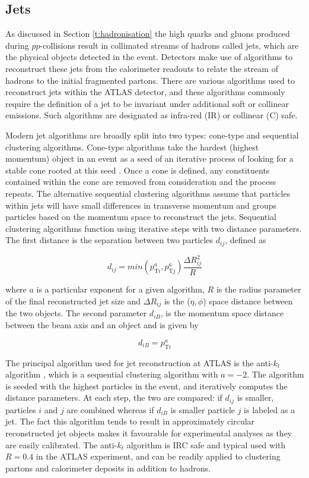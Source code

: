	\subsection{Jets}
	\label{d:jetreco}

	As discussed in Section \ref{t:hadronisation} the high \pt quarks and gluons produced during $pp$-collisions result in collimated streams of hadrons called jets, which are the physical objects detected in the event. Detectors make use of algorithms to reconstruct these jets from the calorimeter readouts to relate the stream of hadrons to the initial fragmented partons. There are various algorithms used to reconstruct jets within the ATLAS detector, and these algorithms commonly require the definition of a jet to be invariant under additional soft or collinear emissions. Such algorithms are designated as infra-red (IR) or collinear (C) safe.

	Modern jet algorithms are broadly split into two types: cone-type and sequential clustering algorithms. Cone-type algorithms take the hardest (highest momentum) object in an event as a seed of an iterative process of looking for a stable cone rooted at this seed \cite{cone-type}. Once a cone is defined, any constituents contained within the cone are removed from consideration and the process repeats. The alternative sequential clustering algorithms assume that particles within jets will have small differences in transverse momentum and groups particles based on the momentum space to reconstruct the jets. Sequential clustering algorithms function using iterative steps with two distance parameters. The first distance is the separation between two particles $d_{ij}$, defined as

	\begin{equation}
		d_{ij} = min(p_{\text{T}i}^a, p_{\text{T}j}^a)\frac{\Delta R_{ij}^2}{R}
	\end{equation}

	where $a$ is a particular exponent for a given algorithm, $R$ is the radius parameter of the final reconstructed jet size and $\Delta R_{ij}$ is the ($\eta, \phi$) space distance between the two objects. The second parameter $d_{iB}$, is the momentum space distance between the beam axis and an object \cite{jetreco} and is given by

	\begin{equation}
	d_{iB} = p_{\text{T}i}^a
	\end{equation}

	The principal algorithm used for jet reconstruction at ATLAS is the anti-$k_t$ algorithm \cite{antikt}, which is a sequential clustering algorithm with $a=-2$. The algorithm is seeded with the highest \pt particles in the event, and iteratively computes the distance parameters. At each step, the two are compared: if $d_{ij}$ is smaller, particles $i$ and $j$ are combined whereas if $d_{iB}$ is smaller particle $j$ is labeled as a jet. The fact this algorithm tends to result in approximately circular reconstructed jet objects makes it favourable for experimental analyses as they are easily calibrated. The anti-$k_t$ algorithm is IRC safe and typical used with $R=0.4$ in the ATLAS experiment, and can be readily applied to clustering partons and calorimeter deposits in addition to hadrons.

